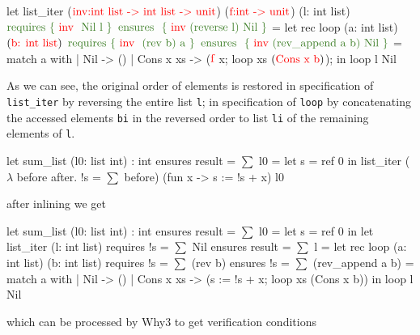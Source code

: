 \documentclass[a4paper,11pt,oneside]{article}
\theoremstyle{plain}
\begin{document}
\begin{small}
	\begin{minipage}[t]{0.4\linewidth}	
	\begin{whycode}  
let list_iter ($\textcolor{red}{\text{inv:int list -> int list -> unit}}$) ($\textcolor{red}{\text{f:int -> unit}}$) (l: int list)
     $\textcolor{OliveGreen}{\text{requires \{ \textcolor{red}{\text{inv }} Nil~l \}}}$
     $\textcolor{OliveGreen}{\text{ensures~~}\{ \text{ \textcolor{red}{inv} (reverse l)~Nil
     	 }\}}$    
 = let rec loop (a: int list) $(\textcolor{red}{\text{b: int list}})$
     $\textcolor{OliveGreen}{\text{requires \{
         \textcolor{red}{\text{inv }} (rev b)~a \}}}$
     $\textcolor{OliveGreen}{\text{ensures~~}\{ \text{ \textcolor{red}{inv} (rev\_append a b)~Nil
     	 }\}}$  
    = match a with 
       | Nil       -> ()
       | Cons x xs -> ($\textcolor{red}{\text{f}}$ x; loop xs $(\textcolor{red}{\text{Cons x b}})$); 
   in loop l Nil
 	\end{whycode}
 	\end{minipage}
 \end{small}	 

As we can see, the original order of elements is restored in specification of \texttt{list\_iter}  by reversing the entire list \texttt{l}; in specification of \texttt{loop} by concatenating the accessed elements \texttt{bi} in the reversed order to list \texttt{li} of the remaining elements of \texttt{l}.

\begin{whycode}
  let sum_list (l0: list int) : int
    ensures { result = $\sum$ l0 }
  = let s = ref 0 in
    list_iter
       ($\lambda$ before after. !s = $\sum$ before)
       (fun x -> s := !s + x) l0
\end{whycode}

after inlining we get

\begin{whycode}
let sum_list (l0: list int) : int
  ensures { result = $\sum$ l0 }
= let s = ref 0 in
  let list_iter (l: int list)
     requires { !s = $\sum$ Nil }
     ensures { result = $\sum$ l }
   = let rec loop (a: int list) (b: int list)
       requires { !s = $\sum$ (rev b) }
       ensures  { !s = $\sum$ (rev_append a b) }
     = match a with
       | Nil       -> ()
       | Cons x xs -> (s := !s + x; loop xs (Cons x b)) 
   in
   loop l Nil
\end{whycode}

which can be processed by Why3 to get verification conditions
\end{document}
